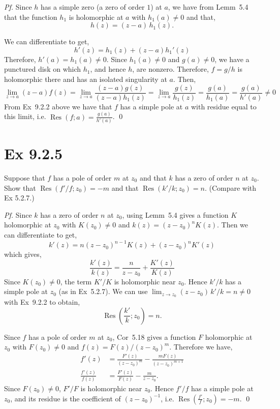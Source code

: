 \documentclass[a4paper]{article}
\DeclareMathOperator{\Res}{Res}
\begin{document}
\textit{Pf.} Since $h$ has a simple zero (a zero of order $1$) at $a$, we have from Lemm~5.4 that the function $h_1$ is holomorphic at $a$ with $h_1(a)\ne 0$ and that,
\[
h(z)=(z-a)\,h_1(z).
\]

We can differentiate to get, 
\[
h'(z)=h_1(z)+(z-a)h_1'(z)
\]
Therefore, $h'(a)=h_1(a)\ne 0$. Since $h_1(a)\ne 0$ and $g(a)\ne 0$, we have a punctured disk on which $h_1$, and hence $h$, are nonzero. Therefore, $f=g/h$ is holomorphic there and has an isolated singularity
at $a$. Then,
\[
\lim_{z\to a}(z-a)f(z)
=\lim_{z\to a}\frac{(z-a)g(z)}{(z-a)h_1(z)}
=\lim_{z\to a}\frac{g(z)}{h_1(z)}
=\frac{g(a)}{h_1(a)}=\frac{g(a)}{h'(a)}\ne 0
\]
From Ex~9.2.2 above we have that $f$ has a simple pole at $a$ with residue equal to this limit, i.e. $\displaystyle \Res(f;a)=\frac{g(a)}{h'(a)}$. \qed

\newpage
\section*{Ex 9.2.5}

\begin{prob}
Suppose that $f$ has a pole of order $m$ at $z_0$ and that $k$ has a zero of
order $n$ at $z_0$. Show that $\Res(f'/f;z_0)=-m$ and that $\Res(k'/k;z_0)=n$.
(Compare with Ex 5.2.7.)
\end{prob}

\textit{Pf.} Since $k$ has a zero of order $n$ at $z_0$, using Lemm~5.4 gives a function $K$ holomorphic at $z_0$ with $K(z_0)\ne 0$ and $k(z)=(z-z_0)^nK(z)$. Then we can differentiate to get,
\[
k'(z) = n(z-z_0)^{n-1}K(z)+(z-z_0)^nK'(z)
\]
which gives,
\[
\frac{k'(z)}{k(z)} = \frac{n}{z-z_0}+\frac{K'(z)}{K(z)}
\]
Since $K(z_0)\ne 0$, the term $K'/K$ is holomorphic near $z_0$. Hence $k'/k$ has a simple pole at $z_0$ (as in Ex~5.2.7). We can use $\lim_{z\to z_0}(z-z_0)\,k'/k=n\ne 0$ with Ex~9.2.2 to obtain,
\[
\Res\!\left(\frac{k'}{k};z_0\right)=n.
\]

\medskip
Since $f$ has a pole of order $m$ at $z_0$, Cor~5.18
gives a function $F$ holomorphic at $z_0$ with $F(z_0)\ne 0$ and
$f(z)=F(z)/(z-z_0)^m$. Therefore we have,
\begin{align*}
f'(z)&=\frac{F'(z)}{(z-z_0)^m}-\frac{mF(z)}{(z-z_0)^{m+1}} \\
\frac{f'(z)}{f(z)}&=\frac{F'(z)}{F(z)}-\frac{m}{z-z_0}.
\end{align*}
Since $F(z_0)\ne 0$, $F'/F$ is holomorphic near $z_0$. Hence $f'/f$ has a simple pole at $z_0$, and its residue is the coefficient of $(z-z_0)^{-1}$, i.e.
$\displaystyle \Res\!\left(\frac{f'}{f};z_0\right)=-m$. \qed
\end{document}
